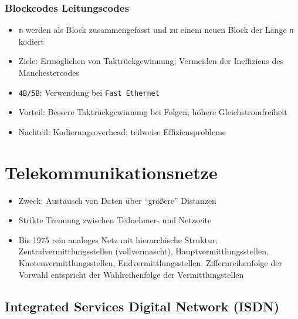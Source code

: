 \subsubsection{Blockcodes Leitungscodes}
\begin{itemize}
	\item \texttt{m} werden als Block zusammengefasst und zu einem neuen Block der Länge \texttt{n} kodiert
	\item Ziele: Ermöglichen von Taktrückgewinnung; Vermeiden der Ineffiziens des Manchestercodes
	\item \texttt{4B/5B}: Verwendung bei \texttt{Fast Ethernet}
	\item Vorteil: Bessere Taktrückgewinnung bei Folgen; höhere Gleichstromfreiheit
	\item Nachteil: Kodierungsoverhead; teilweise Effiziensprobleme
\end{itemize}



\section{Telekommunikationsnetze}
\begin{itemize}
	\item Zweck: Austausch von Daten über "`größere"' Distanzen
	\item Strikte Trennung zwischen Teilnehmer- und Netzseite
	\item Bis 1975 rein analoges Netz mit hierarchische Struktur: Zentralvermittlungsstellen (vollvermascht), Hauptvermittlungsstellen, Knotenvermittlungsstellen, Endvermittlungsstellen. Ziffernreihenfolge der Vorwahl entspricht der Wahlreihenfolge der Vermittlungstellen
\end{itemize}

\subsection{Integrated Services Digital Network (ISDN)}

